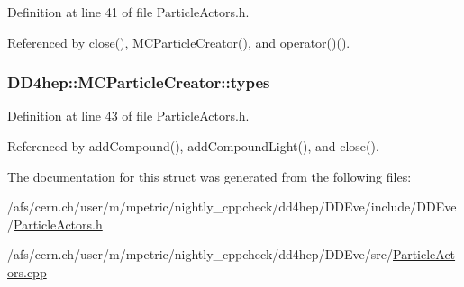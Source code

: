 Definition at line 41 of file ParticleActors.h.

Referenced by close(), MCParticleCreator(), and operator()().\hypertarget{struct_d_d4hep_1_1_m_c_particle_creator_a622e212ec5e4471e2ae306e44839a69c}{
\subsubsection[{types}]{ {\bf DD4hep::MCParticleCreator::types}}}
\label{struct_d_d4hep_1_1_m_c_particle_creator_a622e212ec5e4471e2ae306e44839a69c}


Definition at line 43 of file ParticleActors.h.

Referenced by addCompound(), addCompoundLight(), and close().

The documentation for this struct was generated from the following files:\begin{DoxyCompactItemize}
\item 
/afs/cern.ch/user/m/mpetric/nightly\_\-cppcheck/dd4hep/DDEve/include/DDEve/\hyperlink{_particle_actors_8h}{ParticleActors.h}\item 
/afs/cern.ch/user/m/mpetric/nightly\_\-cppcheck/dd4hep/DDEve/src/\hyperlink{_particle_actors_8cpp}{ParticleActors.cpp}\end{DoxyCompactItemize}
